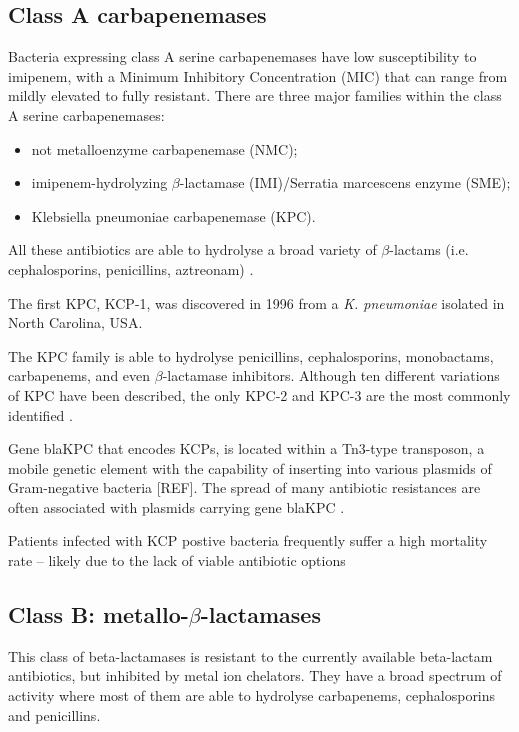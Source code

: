 \documentclass[11pt]{report}
\begin{document}
\subsection{Class A carbapenemases}
Bacteria expressing class A serine carbapenemases have low susceptibility to imipenem, with a Minimum Inhibitory Concentration (MIC) that can range from mildly elevated to fully resistant. 
There are three major families within the class A serine carbapenemases:

\begin{itemize}
\item not metalloenzyme carbapenemase (NMC);
\item imipenem-hydrolyzing $\beta$-lactamase (IMI)/Serratia marcescens enzyme (SME); 
\item Klebsiella pneumoniae carbapenemase (KPC).
\end{itemize}

All these antibiotics are able to hydrolyse a broad variety of $\beta$-lactams (i.e. cephalosporins, penicillins, aztreonam) \cite{kong2010beta} \cite{Queenan2007}.

The first KPC, KCP-1, was discovered in 1996 from a \emph{K. pneumoniae} isolated in North Carolina, USA.

The KPC family is able to hydrolyse penicillins, cephalosporins, monobactams, carbapenems, and even $\beta$-lactamase inhibitors. Although ten different variations of KPC have been described, the only KPC-2 and KPC-3 are the most commonly identified \cite{WaltherRasmussen2007} \cite{MunozPrice2013}.

Gene blaKPC that encodes KCPs, is located within a Tn3-type transposon, a mobile genetic element with the capability of inserting into various plasmids of Gram-negative bacteria [REF].  The spread of many antibiotic resistances are often associated with plasmids carrying gene blaKPC \cite{Queenan2007}.

Patients infected with KCP postive bacteria frequently suffer a high mortality rate – likely due to the lack of viable antibiotic options \cite{MunozPrice2013}

\subsection {Class B: metallo-$\beta$-lactamases}
This class of beta-lactamases is resistant to the currently available beta-lactam antibiotics, but inhibited by metal ion chelators.
They have a broad spectrum of activity where most of them are able to hydrolyse carbapenems, cephalosporins and penicillins.
\end{document}

